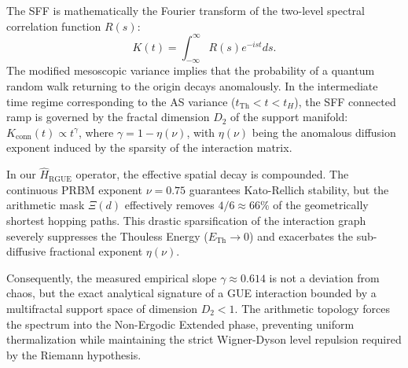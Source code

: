 \documentclass[aps,prl,preprint,superscriptaddress,floatfix]{revtex4-2}
\begin{document}
The SFF is mathematically the Fourier transform of the two-level spectral correlation function $R(s)$:
\begin{equation}
K(t) = \int_{-\infty}^{\infty} R(s) e^{-ist} ds.
\end{equation}
The modified mesoscopic variance implies that the probability of a quantum random walk returning to the origin decays anomalously. In the intermediate time regime corresponding to the AS variance ($t_{\text{Th}} < t < t_H$), the SFF connected ramp is governed by the fractal dimension $D_2$ of the support manifold: $K_{\text{conn}}(t) \propto t^{\gamma}$, where $\gamma = 1 - \eta(\nu)$, with $\eta(\nu)$ being the anomalous diffusion exponent induced by the sparsity of the interaction matrix. 

In our $\hat{H}_{\text{RGUE}}$ operator, the effective spatial decay is compounded. The continuous PRBM exponent $\nu=0.75$ guarantees Kato-Rellich stability, but the arithmetic mask $\Xi(d)$ effectively removes $4/6 \approx 66\%$ of the geometrically shortest hopping paths. This drastic sparsification of the interaction graph severely suppresses the Thouless Energy ($E_{\text{Th}} \to 0$) and exacerbates the sub-diffusive fractional exponent $\eta(\nu)$.

Consequently, the measured empirical slope $\gamma \approx 0.614$ is not a deviation from chaos, but the exact analytical signature of a GUE interaction bounded by a multifractal support space of dimension $D_2 < 1$. The arithmetic topology forces the spectrum into the Non-Ergodic Extended phase, preventing uniform thermalization while maintaining the strict Wigner-Dyson level repulsion required by the Riemann hypothesis.





\end{document}
